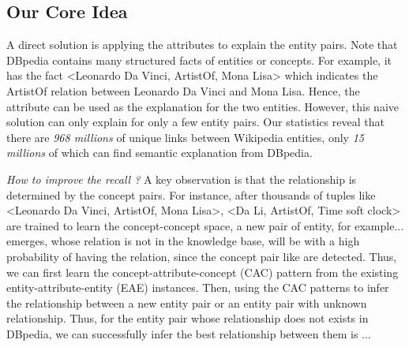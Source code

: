 \subsection{Our Core Idea}
A direct solution is applying the attributes to explain the entity pairs. 
Note that DBpedia contains many structured facts of entities or concepts.
For example, it has the fact \ac{<Leonardo Da Vinci, ArtistOf, Mona Lisa>} which indicates the \ac{ArtistOf} relation between \ac{Leonardo Da Vinci} and \ac{Mona Lisa}.
Hence, the attribute can be used as the explanation for the two entities.
However, this naive solution can only explain for only a few entity pairs. 
Our statistics reveal that there are \emph{ 968 millions} of unique links between Wikipedia entities, only \emph{15 millions} of which can find semantic explanation from DBpedia.


{\it How to improve the recall ?} 
A key observation is that the relationship is determined by the concept pairs. 
For instance, after thousands of tuples like \ac{<Leonardo Da Vinci, ArtistOf, Mona Lisa>}, \ac{<Da Li, ArtistOf, Time soft clock>} are trained to learn the concept-concept space, a new pair of entity, for example... emerges, whose relation is not in the knowledge base, will be with a high probability of having the  relation, since the concept pair like  are detected.
Thus, we can first learn the concept-attribute-concept (CAC) pattern from the existing entity-attribute-entity (EAE) instances. 
Then, using the CAC patterns to infer the relationship between a new entity pair or an entity pair with unknown relationship.
Thus, for the entity pair whose relationship does not exists in DBpedia, we can successfully infer the best relationship between them is ...
 
